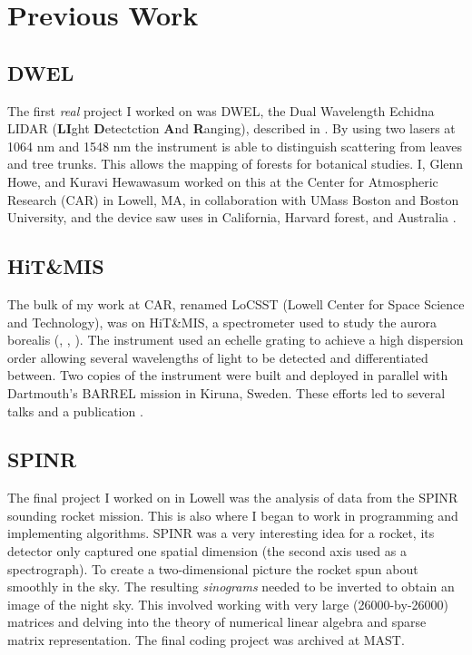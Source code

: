 \documentclass{article}
\begin{document}
    \section{Previous Work}
        \subsection{DWEL}
            The first \textit{real} project I worked on was DWEL, the
            Dual Wavelength Echidna LIDAR
            (\textbf{LI}ght \textbf{D}etectction \textbf{A}nd \textbf{R}anging),
            described in \cite{DWEL2012}.
            By using two lasers at 1064 nm and 1548 nm the instrument is able
            to distinguish scattering from leaves and tree trunks. This allows
            the mapping of forests for botanical studies. I, Glenn Howe, and
            Kuravi Hewawasum worked on this at the Center for Atmospheric
            Research (CAR) in Lowell, MA, in collaboration with UMass Boston
            and Boston University, and the device saw uses in California,
            Harvard forest, and Australia
            \cite{Li2016RadiometricCO}.
        \subsection{HiT\&MIS}
            The bulk of my work at CAR, renamed LoCSST
            (Lowell Center for Space Science and Technology), was on
            HiT\&MIS, a spectrometer used to study the aurora borealis
            (\cite{2011AGUFMSA13B1890C}, \cite{2014AGUFMSA13B4000H},
            \cite{2015AGUFMSA13B2369A}). The
            instrument used an echelle grating to achieve a high dispersion
            order allowing several wavelengths of light to be detected and
            differentiated between. Two copies of the instrument were built
            and deployed in parallel with Dartmouth's BARREL mission in
            Kiruna, Sweden. These efforts led to several talks and a
            publication \cite{AryalHewawasamMaguire2018DerivationHitAndMIS}.
        \subsection{SPINR}
            The final project I worked on in Lowell was the analysis of data
            from the SPINR sounding rocket mission. This is also where I began
            to work in programming and implementing algorithms. SPINR was a very
            interesting idea for a rocket, its detector only captured one
            spatial dimension (the second axis used as a spectrograph). To
            create a two-dimensional picture the rocket spun about smoothly
            in the sky. The resulting \textit{sinograms} needed to be inverted
            to obtain an image of the night sky. This involved working with
            very large (26000-by-26000) matrices and delving into the theory of
            numerical linear algebra and sparse matrix representation. The
            final coding project was archived at MAST.
\end{document}
